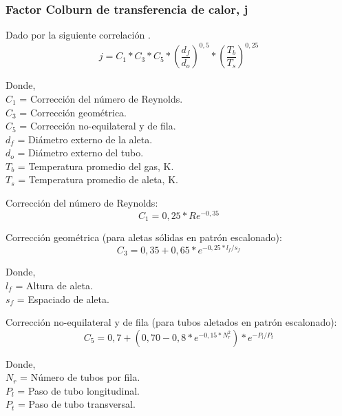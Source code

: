\subsubsection{Factor Colburn de transferencia de calor, j}
\par Dado por la siguiente correlación \cite{bib:colburn}.
\begin{equation}
j = C_1 *C_3 *C_5 *(\dfrac{d_f}{d_o})^{0,5} *(\frac{T_b}{T_s})^{0,25}
\end{equation}
\par Donde, \\
$C_1$ = Corrección del número de Reynolds. \\
$C_3$ = Corrección geométrica. \\
$C_5$ = Corrección no-equilateral y de fila. \\
$d_f$ = Diámetro externo de la aleta. \\
$d_o$ = Diámetro externo del tubo. \\
$T_b$ = Temperatura promedio del gas, K. \\
$T_s$ = Temperatura promedio de aleta, K.
\par Corrección del número de Reynolds:
\begin{equation}
C_1 = 0,25 *Re^{-0,35}
\end{equation}
\par Corrección geométrica (para aletas sólidas en patrón escalonado):
\begin{equation}
C_3 = 0,35 +0,65 *e^{-0,25*l_f/s_f}
\end{equation}
\par Donde, \\
$l_f$ = Altura de aleta. \\
$s_f$ = Espaciado de aleta.
\par Corrección no-equilateral y de fila (para tubos aletados en patrón escalonado):
\begin{equation}
C_5 = 0,7 +(0,70 -0,8 *e^{-0,15 *N_r^2}) *e^{-P_l/P_t}
\end{equation}
\par Donde, \\
$N_r$ = Número de tubos por fila. \\
$P_l$ = Paso de tubo longitudinal.\\
$P_t$ = Paso de tubo transversal. \\

